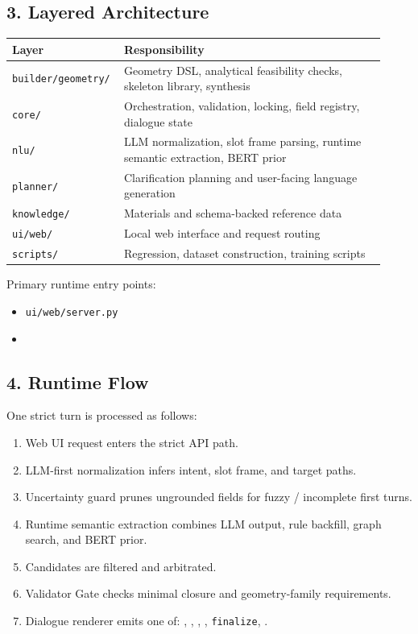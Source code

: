 \documentclass[11pt,a4paper]{ctexart}
\begin{document}
\subsection*{3. Layered Architecture}

\begin{longtable}{>{\raggedright\arraybackslash}p{0.24\linewidth} >{\raggedright\arraybackslash}p{0.68\linewidth}}
\toprule
Layer & Responsibility \\
\midrule
\texttt{builder/geometry/} & Geometry DSL, analytical feasibility checks, skeleton library, synthesis \\
\texttt{core/} & Orchestration, validation, locking, field registry, dialogue state \\
\texttt{nlu/} & LLM normalization, slot frame parsing, runtime semantic extraction, BERT prior \\
\texttt{planner/} & Clarification planning and user-facing language generation \\
\texttt{knowledge/} & Materials and schema-backed reference data \\
\texttt{ui/web/} & Local web interface and request routing \\
\texttt{scripts/} & Regression, dataset construction, training scripts \\
\bottomrule
\end{longtable}

Primary runtime entry points:

\begin{itemize}
\item \texttt{ui/web/server.py}
\item {}
\end{itemize}

\subsection*{4. Runtime Flow}

One strict turn is processed as follows:

\begin{enumerate}
\item Web UI request enters the strict API path.
\item LLM-first normalization infers intent, slot frame, and target paths.
\item Uncertainty guard prunes ungrounded fields for fuzzy / incomplete first turns.
\item Runtime semantic extraction combines LLM output, rule backfill, graph search, and BERT prior.
\item Candidates are filtered and arbitrated.
\item Validator Gate checks minimal closure and geometry-family requirements.
\item Dialogue renderer emits one of: , , , , \texttt{finalize}, .
\end{enumerate}
\end{document}
